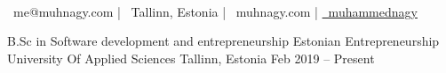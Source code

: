 \documentclass[]{awesome-cv}
\begin{document}
    
\begin{center}
	  \\
	\vspace{1mm}
	{\faEnvelope\ me@muhnagy.com} | {\faMapMarker\ Tallinn, Estonia} | {\faLink\ muhnagy.com} | \href{http://www.github.com/muhammednagy}{\faGithub\ muhammednagy}
\end{center}
\begin{cventries}
	\cventry
	{B.Sc in Software development and entrepreneurship}
	{Estonian Entrepreneurship University Of Applied Sciences}
	{Tallinn, Estonia}
	{Feb 2019 – Present}
	{}
\end{cventries}
\end{document}
